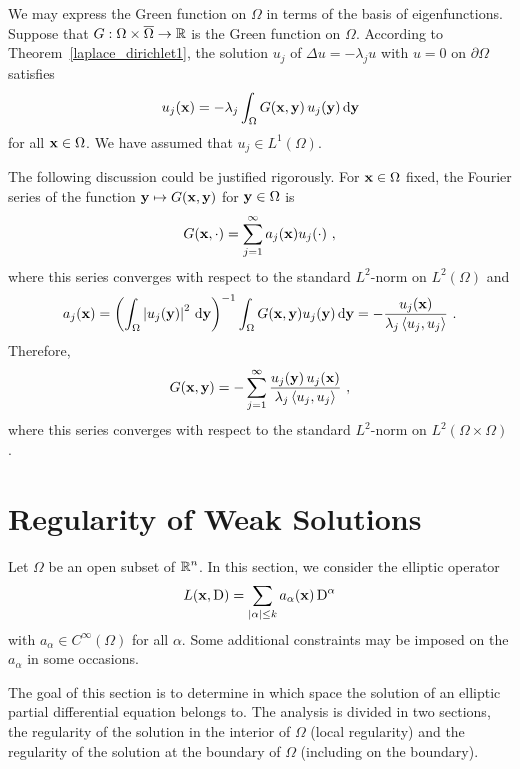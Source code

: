 \begin{egg}
We may express the Green function on $\Omega$ in terms of the basis
of eigenfunctions.  Suppose that
$G:\Omega\times\overline{\Omega} \rightarrow \mathbb{R}$ is the Green
function on $\Omega$.  According to
Theorem~\ref{laplace_dirichlet1}, the solution $u_j$ of
$\Delta u = -\lambda_j u$ with $u=0$ on $\partial \Omega$ satisfies
\[
u_j(\mathbf{x}) = -\lambda_j \int_{\Omega} G(\mathbf{x},\mathbf{y})\, u_j(\mathbf{y})
\,\mathrm{d}{\mathbf{y}}
\]
for all $\mathbf{x} \in \Omega$.  We have assumed that
$\displaystyle u_j \in L^1(\Omega)$.

The following discussion could be justified rigorously.
For $\mathbf{x} \in \Omega$ fixed, the Fourier series of
the function $\mathbf{y} \mapsto G(\mathbf{x},\mathbf{y})$ for
$\mathbf{y} \in \Omega$ is
\[
G(\mathbf{x}, \cdot) = \sum_{j=1}^\infty a_j(\mathbf{x}) u_j(\cdot) \ ,
\]
where this series converges with respect to the
standard $\displaystyle L^2$-norm on $\displaystyle L^2(\Omega)$ and
\[
a_j(\mathbf{x})
= \left( \int_{\Omega} \left|u_j(\mathbf{y})\right|^2 \,\mathrm{d}{\mathbf{y}} \right)^{-1}
\int_{\Omega} G(\mathbf{x},\mathbf{y}) u_j(\mathbf{y}) \,\mathrm{d}{\mathbf{y}}
= - \frac{u_j(\mathbf{x})}{\lambda_j \left\langle{u_j} , {u_j}\right\rangle} \ .
\]
Therefore,
\[
G(\mathbf{x},\mathbf{y}) = - \sum_{j=1}^\infty \frac{u_j(\mathbf{y})\,u_j(\mathbf{x})}
{\lambda_j \left\langle{u_j} , {u_j}\right\rangle} \ ,
\]
where this series converges with respect to the standard
$\displaystyle L^2$-norm on $\displaystyle L^2(\Omega\times\Omega)$.
\end{egg}

\section{Regularity of Weak Solutions} \label{ell_reg_of_sols}

Let $\Omega$ be an open subset of $\displaystyle \mathbb{R}^n$.  In this section, we
consider the elliptic operator 
\begin{equation} \label{ell_reg_ellOp}
L(\mathbf{x},\operatorname{D}) = \sum_{|\alpha|\leq k} a_\alpha(\mathbf{x}) \operatorname{D}^\alpha
\end{equation}
with $\displaystyle a_\alpha \in C^\infty(\Omega)$ for all $\alpha$.  Some
additional constraints may be imposed on the $a_\alpha$ in some occasions.

The goal of this section is to determine in which space the solution
of an elliptic partial differential equation belongs to.
The analysis is divided in two sections, the regularity of the
solution in the interior of $\Omega$ (local regularity) and the
regularity of the solution at the boundary of $\Omega$ (including on
the boundary).

